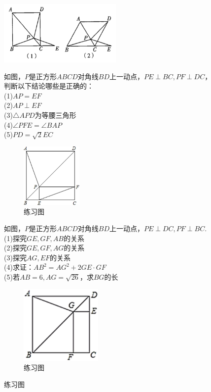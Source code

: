 \documentclass{ecnuthesis}
\begin{document}
\begin{figure}[H]
\centering
\includegraphics[width=6cm]{picture/640.png}
\caption{练习图}
\begin{problem}
    如图，$P$是正方形$ABCD$对角线$BD$上一动点，$PE\perp BC,PF\perp DC$，判断以下结论哪些是正确的：\\
    (1)$AP=EF$ \\
    (2)$AP\perp EF$ \\
    (3)$\triangle APD$为等腰三角形 \\
    (4)$\angle PFE=\angle BAP$ \\
    (5)$PD=\sqrt2 EC$ \\
\end{problem}
\begin{figure}[H]
\centering
\includegraphics[width=3cm]{picture/677.png}
\caption{练习图}
\end{figure}
\begin{problem}
    如图，$P$是正方形$ABCD$对角线$BD$上一动点，$PE\perp DC,PF\perp BC$.\\
    (1)探究$GE,GF,AB$的关系\\
    (2)探究$GE,GF,AG$的关系\\
    (3)探究$AG,EF$的关系\\
    (4)求证：$AB^2=AG^2+2GE·GF$\\
    (5)若$AB=6,AG=\sqrt{26}$，求$BG$的长\\
\end{problem}
\begin{figure}[H]
\centering
\includegraphics[width=4cm]{picture/614.png}
\caption{练习图}
\end{figure}
\end{figure}
\clearpage
\end{document}
